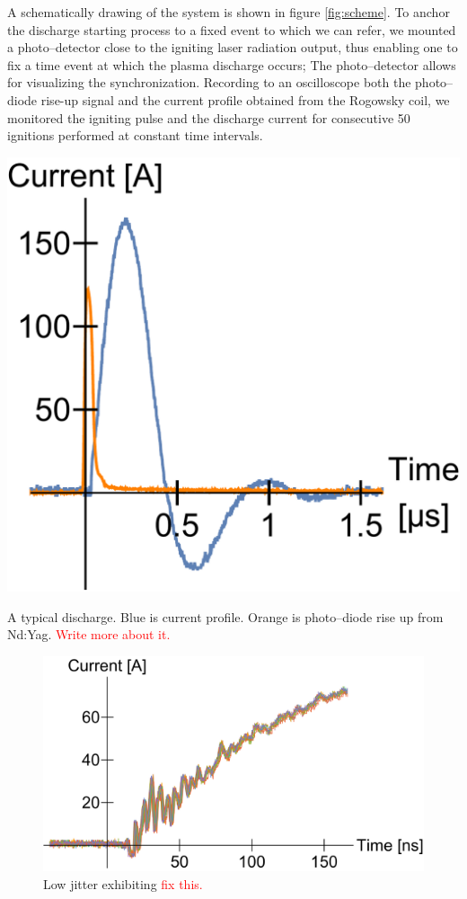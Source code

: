 \documentclass[justified,nofonts,nobib]{tufte-book}
\begin{document}
A schematically drawing of the system is shown in figure \ref{fig:scheme}. To anchor the discharge starting process to a fixed event to which we can refer, we mounted a photo--detector close to the igniting laser radiation output, thus enabling one to fix a time event at which the plasma discharge occurs; The photo--detector allows for visualizing the synchronization. Recording to an oscilloscope both the photo--diode rise-up signal and the current profile obtained from the Rogowsky coil, we monitored the igniting pulse and the discharge current for consecutive 50 ignitions performed at constant time intervals.\begin{marginfigure}
    \includegraphics[width=\marginparwidth]{figures/jitter/discharge_sample.pdf}
    \caption{A typical discharge. Blue is current profile. Orange is photo--diode rise up from Nd:Yag. \textcolor{red}{Write more about it.}}
    \label{discharge_sample}
\end{marginfigure}
\begin{figure}
    \centering
    \includegraphics[width=\textwidth]{figures/jitter/low_jitter.pdf}
    \caption{Low jitter exhibiting \textcolor{red}{fix this.}}
    \label{fig:low_jitter}
\end{figure}
\end{document}
